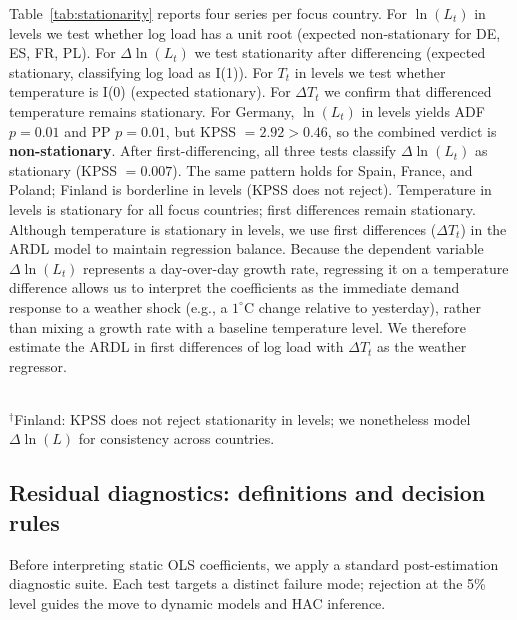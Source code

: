 \documentclass[12pt,a4paper]{article}
\begin{document}
\noindent Table~\ref{tab:stationarity} reports four series per focus country. For $\ln(L_t)$ in levels we test whether log load has a unit root (expected non-stationary for DE, ES, FR, PL). For $\Delta\ln(L_t)$ we test stationarity after differencing (expected stationary, classifying log load as I(1)). For $T_t$ in levels we test whether temperature is I(0) (expected stationary). For $\Delta T_t$ we confirm that differenced temperature remains stationary. For Germany, $\ln(L_t)$ in levels yields ADF $p=0.01$ and PP $p=0.01$, but KPSS $=2.92>0.46$, so the combined verdict is \textbf{non-stationary}. After first-differencing, all three tests classify $\Delta\ln(L_t)$ as stationary (KPSS $=0.007$). The same pattern holds for Spain, France, and Poland; Finland is borderline in levels (KPSS does not reject). Temperature in levels is stationary for all focus countries; first differences remain stationary. Although temperature is stationary in levels, we use first differences ($\Delta T_t$) in the ARDL model to maintain regression balance. Because the dependent variable $\Delta\ln(L_t)$ represents a day-over-day growth rate, regressing it on a temperature difference allows us to interpret the coefficients as the immediate demand response to a weather shock (e.g., a $1^\circ$C change relative to yesterday), rather than mixing a growth rate with a baseline temperature level. We therefore estimate the ARDL in first differences of log load with $\Delta T_t$ as the weather regressor.

\begin{table}[H]
  \centering
  \caption{Unit-root tests: focus countries (four series per country)}
  \label{tab:stationarity}
  \scriptsize
  
  \\[0.5em]
  \footnotesize $^\dag$Finland: KPSS does not reject stationarity in levels; we nonetheless model $\Delta\ln(L)$ for consistency across countries.
\end{table}

\subsection{Residual diagnostics: definitions and decision rules}
\label{sec:residual-diagnostics}

Before interpreting static OLS coefficients, we apply a standard post-estimation diagnostic suite. Each test targets a distinct failure mode; rejection at the 5\% level guides the move to dynamic models and HAC inference.
\end{document}
